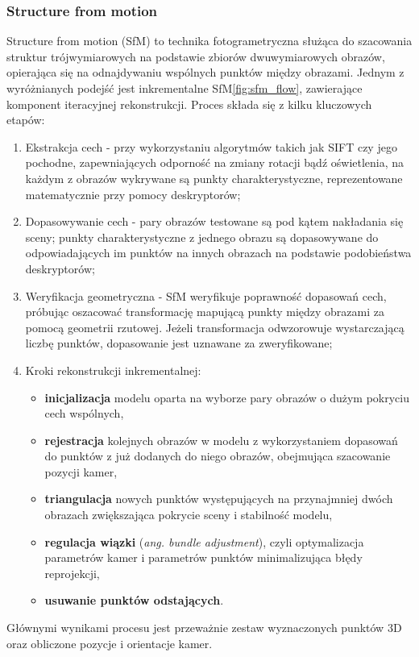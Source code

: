 \subsubsection{Structure from motion}
Structure from motion (SfM) to technika fotogrametryczna służąca do szacowania struktur trójwymiarowych na podstawie zbiorów dwuwymiarowych obrazów, opierająca się na odnajdywaniu wspólnych punktów między obrazami. Jednym z wyróżnianych podejść jest inkrementalne SfM\ref{fig:sfm_flow}, zawierające komponent iteracyjnej rekonstrukcji. Proces składa się z kilku kluczowych etapów:
\begin{enumerate}
  \item Ekstrakcja cech - przy wykorzystaniu algorytmów takich jak SIFT czy jego pochodne, zapewniających odporność na zmiany rotacji bądź oświetlenia, na każdym z obrazów wykrywane są punkty charakterystyczne, reprezentowane matematycznie przy pomocy deskryptorów;
  \item Dopasowywanie cech - pary obrazów testowane są pod kątem nakładania się sceny; punkty charakterystyczne z jednego obrazu są dopasowywane do odpowiadających im punktów na innych obrazach na podstawie podobieństwa deskryptorów;
  \item Weryfikacja geometryczna - SfM weryfikuje poprawność dopasowań cech, próbując oszacować transformację mapującą punkty między obrazami za pomocą geometrii rzutowej. Jeżeli transformacja odwzorowuje wystarczającą liczbę punktów, dopasowanie jest uznawane za zweryfikowane;
  \item Kroki rekonstrukcji inkrementalnej:
    \begin{itemize}
      \item \textbf{inicjalizacja} modelu oparta na wyborze pary obrazów o dużym pokryciu cech wspólnych,
      \item \textbf{rejestracja} kolejnych obrazów w modelu z wykorzystaniem dopasowań do punktów z już dodanych do niego obrazów, obejmująca szacowanie pozycji kamer,
      \item \textbf{triangulacja} nowych punktów występujących na przynajmniej dwóch obrazach zwiększająca pokrycie sceny i stabilność modelu,
      \item \textbf{regulacja wiązki} (\textit{ang. bundle adjustment}), czyli optymalizacja parametrów kamer i parametrów punktów minimalizująca błędy reprojekcji,
      \item \textbf{usuwanie punktów odstających}.
    \end{itemize}
\end{enumerate}
Głównymi wynikami procesu jest przeważnie zestaw wyznaczonych punktów 3D oraz obliczone pozycje i orientacje kamer.

